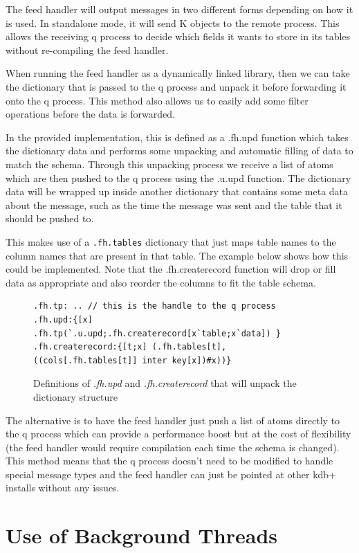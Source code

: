 The feed handler will output messages in two different forms depending on how it is used.
In standalone mode, it will send K objects to the remote process. This allows the receiving
q process to decide which fields it wants to store in its tables without re-compiling the
feed handler.

When running the feed handler as a dynamically linked library, then we can take the dictionary
that is passed to the q process and unpack it before forwarding it onto the q process. This
method also allows us to easily add some filter operations before the data is forwarded.

In the provided implementation, this is defined as a .fh.upd function which takes the dictionary
data and performs some unpacking and automatic filling of data to match the schema. Through this
unpacking process we receive a list of atoms which are then pushed to the q process using the
.u.upd function. The dictionary data will be wrapped up inside another dictionary that contains
some meta data about the message, such as the time the message was sent and the table that it
should be pushed to.

This makes use of a \verb|.fh.tables| dictionary that just maps table names to the column names that
are present in that table. The example below shows how this could be implemented. Note that the
.fh.createrecord function will drop or fill data as appropriate and also reorder the columns to
fit the table schema.

\begin{figure}
\begin{lstlisting}
.fh.tp: .. // this is the handle to the q process
.fh.upd:{[x] .fh.tp(`.u.upd;.fh.createrecord[x`table;x`data]) }
.fh.createrecord:{[t;x] (.fh.tables[t],((cols[.fh.tables[t]] inter key[x])#x))}
\end{lstlisting}
\caption{Definitions of \textit{.fh.upd} and \textit{.fh.createrecord} that will unpack the dictionary structure}
\end{figure}

The alternative is to have the feed handler just push a list of atoms directly to the q process
which can provide a performance boost but at the cost of flexibility (the feed handler would
require compilation each time the schema is changed). This method means that the q process doesn't
need to be modified to handle special message types and the feed handler can just be pointed at other
kdb+ installs without any issues.

\section{Use of Background Threads}

